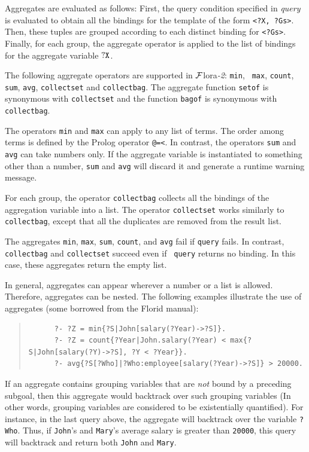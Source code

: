\documentclass[11pt]{article}
\newcommand{\FLORA}{{\mbox{\sc ${\cal F}${lora}\rm\emph{-2}}}\xspace}
\newcommand{\FLORID}{{\mbox{\sc Florid}}\xspace}
\begin{document}
Aggregates are evaluated as follows: First, the query
condition specified in {\it query} is evaluated to obtain all the bindings
for the template of the form {\tt \texttt{<}?X, ?Gs\texttt{>}}. Then, these
tuples are grouped according to each distinct binding for
{\tt \texttt{<}?Gs\texttt{>}}. Finally, for each group, the aggregate operator
is applied to the list of bindings for the aggregate variable $\tt ?X$.


%
The following aggregate operators are supported in \FLORA: {\tt min}, {\tt
  max}, {\tt count}, {\tt sum}, {\tt avg}, {\tt collectset}
  and {\tt collectbag}. The aggregate
function {\tt setof} is synonymous with
{\tt collectset} and the function {\tt bagof} is synonymous with {\tt
  collectbag}.

The operators {\tt min} and {\tt max} can apply to any list of
terms. The order among terms is defined by the Prolog operator {\tt @=<}.  In
contrast, the operators {\tt sum} and {\tt avg} can take numbers only. If
the aggregate variable is instantiated to something other than a
number, {\tt sum} and {\tt avg} will discard it and generate a runtime
warning message.

For each group, the operator {\tt collectbag} collects all the bindings of
the aggregation variable into a list. The operator {\tt collectset} works
similarly to {\tt collectbag}, except that all the duplicates are removed
from the result list.


The aggregates {\tt min}, {\tt max}, {\tt sum}, {\tt count}, and {\tt avg}
fail if {\tt query} fails.
In contrast, {\tt collectbag} and {\tt collectset} succeed even if {\tt
  query} returns no binding. In this case, these aggregates return the
empty list.

In general, aggregates can appear wherever a number or a list is
allowed. Therefore, aggregates can be nested. The following examples
illustrate the use of aggregates (some borrowed from the \FLORID manual):
\begin{quote}
\begin{verbatim}
      ?- ?Z = min{?S|John[salary(?Year)->?S]}.
      ?- ?Z = count{?Year|John.salary(?Year) < max{?S|John[salary(?Y)->?S], ?Y < ?Year}}.
      ?- avg{?S[?Who]|?Who:employee[salary(?Year)->?S]} > 20000. 
\end{verbatim}
\end{quote}
If an aggregate contains grouping variables that are \emph{not} bound
by a preceding subgoal, then this aggregate would backtrack over such
grouping variables (In other words, grouping variables are considered to be
existentially quantified). For instance, in the last query above, the
aggregate will backtrack over the variable {\tt ?Who}. Thus, if
{\tt John}'s and {\tt Mary}'s average salary is greater than {\tt 20000},
this query will backtrack and return both {\tt John} and {\tt Mary}.
\end{document}
